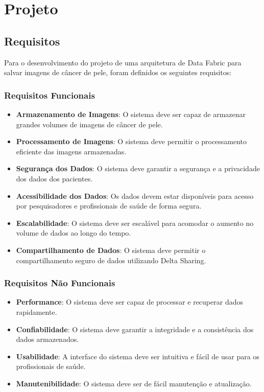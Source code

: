 
\chapter[Projeto]{Projeto}

\section{Requisitos}

Para o desenvolvimento do projeto de uma arquitetura de Data Fabric para salvar imagens de câncer de pele, foram definidos os seguintes requisitos:

\subsection{Requisitos Funcionais}
\begin{itemize}
    \item \textbf{Armazenamento de Imagens}: O sistema deve ser capaz de armazenar grandes volumes de imagens de câncer de pele.
    \item \textbf{Processamento de Imagens}: O sistema deve permitir o processamento eficiente das imagens armazenadas.
    \item \textbf{Segurança dos Dados}: O sistema deve garantir a segurança e a privacidade dos dados dos pacientes.
    \item \textbf{Acessibilidade dos Dados}: Os dados devem estar disponíveis para acesso por pesquisadores e profissionais de saúde de forma segura.
    \item \textbf{Escalabilidade}: O sistema deve ser escalável para acomodar o aumento no volume de dados ao longo do tempo.
    \item \textbf{Compartilhamento de Dados}: O sistema deve permitir o compartilhamento seguro de dados utilizando Delta Sharing.
\end{itemize}

\subsection{Requisitos Não Funcionais}
\begin{itemize}
    \item \textbf{Performance}: O sistema deve ser capaz de processar e recuperar dados rapidamente.
    \item \textbf{Confiabilidade}: O sistema deve garantir a integridade e a consistência dos dados armazenados.
    \item \textbf{Usabilidade}: A interface do sistema deve ser intuitiva e fácil de usar para os profissionais de saúde.
    \item \textbf{Manutenibilidade}: O sistema deve ser de fácil manutenção e atualização.
\end{itemize}

